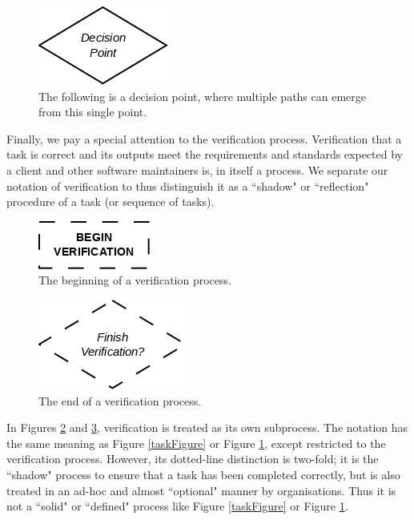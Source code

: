 \begin{figure}[ht!]
\centering
\includegraphics[scale=0.6]{media/Branching}
\caption{The following is a decision point, where multiple paths can emerge from this single point.}
\label{branFigure}
\end{figure}


Finally, we pay a special attention to the verification process.
Verification that a task is correct and its outputs meet the requirements and standards expected by a client
and other software maintainers is, in itself a process.
We separate our notation of verification to thus distinguish it as a ``shadow" or ``reflection"
procedure of a task (or sequence of tasks).

\begin{figure}[ht!]
\centering
\includegraphics[scale=0.6]{media/BeginVerification}
\caption{The beginning of a verification process.}
\label{veriprime}
\end{figure}

\begin{figure}[ht!]
\centering
\includegraphics[scale=0.6]{media/EndVerification}
\caption{The end of a verification process.}
\label{verification}
\end{figure}

In Figures \ref{veriprime} and \ref{verification}, verification is treated as its own subprocess. The notation has the same meaning as
Figure \ref{taskFigure} or Figure \ref{branFigure}, except restricted to the verification process.
However, its dotted-line distinction is
two-fold; it is the ``shadow" process to ensure that a task has been completed correctly, but is
also treated in an ad-hoc and almost ``optional" manner by organisations.
Thus it is not a ``solid" or ``defined" process like Figure \ref{taskFigure} or Figure \ref{branFigure}.

